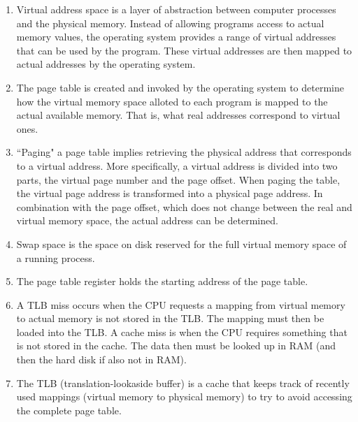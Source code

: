 \documentclass{3330hw}
\begin{document}
\maketitle

\begin{enumerate}

\item Virtual address space is a layer of abstraction between computer processes and the physical memory. Instead of allowing programs access to actual memory values, the operating system provides a range of virtual addresses that can be used by the program. These virtual addresses are then mapped to actual addresses by the operating system.

\item The page table is created and invoked by the operating system to determine how the virtual memory space alloted to each program is mapped to the actual available memory. That is, what real addresses correspond to virtual ones.

\item ``Paging" a page table implies retrieving the physical address that corresponds to a virtual address. More specifically, a virtual address is divided into two parts, the virtual page number and the page offset. When paging the table, the virtual page address is transformed into a physical page address. In combination with the page offset, which does not change between the real and virtual memory space, the actual address can be determined.

\item Swap space is the space on disk reserved for the full virtual memory space of a running process.

\item The page table register holds the starting address of the page table.

\item A TLB miss occurs when the CPU requests a mapping from virtual memory to actual memory is not stored in the TLB. The mapping must then be loaded into the TLB. A cache miss is when the CPU requires something that is not stored in the cache. The data then must be looked up in RAM (and then the hard disk if also not in RAM).

\item The TLB (translation-lookaside buffer) is a cache that keeps track of recently used mappings (virtual memory to physical memory) to try to avoid accessing the complete page table.


\end{enumerate}
\end{document}
